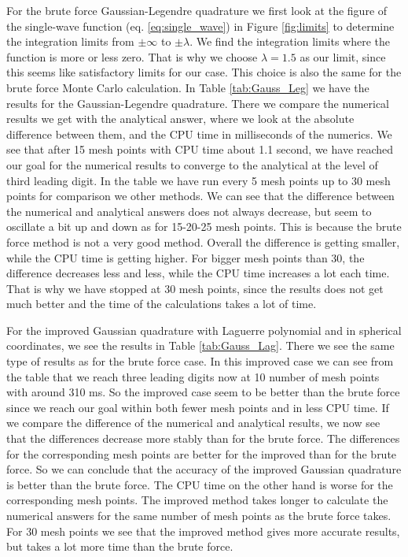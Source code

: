\documentclass[12pt,a4paper,english]{article}
\begin{document}
For the brute force Gaussian-Legendre quadrature we first look at the figure of the single-wave function (eq. \ref{eq:single_wave}) in Figure \ref{fig:limits} to determine the integration limits from $\pm\infty$ to $\pm\lambda$. We find the integration limits where the function is more or less zero. That is why we choose $\lambda=1.5$ as our limit, since this seems like satisfactory limits for our case. This choice is also the same for the brute force Monte Carlo calculation. In Table \ref{tab:Gauss_Leg} we have the results for the Gaussian-Legendre quadrature. There we compare the numerical results we get with the analytical answer, where we look at the absolute difference between them, and the CPU time in milliseconds of the numerics. We see that after 15 mesh points with CPU time about 1.1 second, we have reached our goal for the numerical results to converge to the analytical at the level of third leading digit. In the table we have run every 5 mesh points up to 30 mesh points for comparison we other methods. We can see that the difference between the numerical and analytical answers does not always decrease, but seem to oscillate a bit up and down as for 15-20-25 mesh points. This is because the brute force method is not a very good method. Overall the difference is getting smaller, while the CPU time is getting higher. For bigger mesh points than 30, the difference decreases less and less, while the CPU time increases a lot each time. That is why we have stopped at 30 mesh points, since the results does not get much better and the time of the calculations takes a lot of time. 

For the improved Gaussian quadrature with Laguerre polynomial and in spherical coordinates, we see the results in Table \ref{tab:Gauss_Lag}. There we see the same type of results as for the brute force case. In this improved case we can see from the table that we reach three leading digits now at 10 number of mesh points with around 310 ms. So the improved case seem to be better than the brute force since we reach our goal within both fewer mesh points and in less CPU time. If we compare the difference of the numerical and analytical results, we now see that the differences decrease more stably than for the brute force. The differences for the corresponding mesh points are better for the improved than for the brute force. So we can conclude that the accuracy of the improved Gaussian quadrature is better than the brute force. The CPU time on the other hand is worse for the corresponding mesh points. The improved method takes longer to calculate the numerical answers for the same number of mesh points as the brute force takes. For 30 mesh points we see that the improved method gives more accurate results, but takes a lot more time than the brute force.
\end{document}
